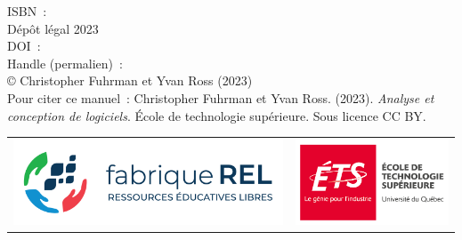 

ISBN~: \\
Dépôt légal 2023 \\
DOI~: \\
Handle (permalien)~: \\
© Christopher Fuhrman et Yvan Ross (2023)\\
Pour citer ce manuel~: Christopher Fuhrman et Yvan Ross. (2023). \emph{Analyse et conception de logiciels}.
École de technologie supérieure. Sous licence CC BY.


\vfill
\begin{tabular}{m{3.5in}m{3.5in}}
\includegraphics[height=1in]{images/F-REL_logo-coul-horiz.png} &
\includegraphics[height=1in]{images/Logo_ETS_TypoGrise_D_FR_1.png}\\
\end{tabular}
\normalsize